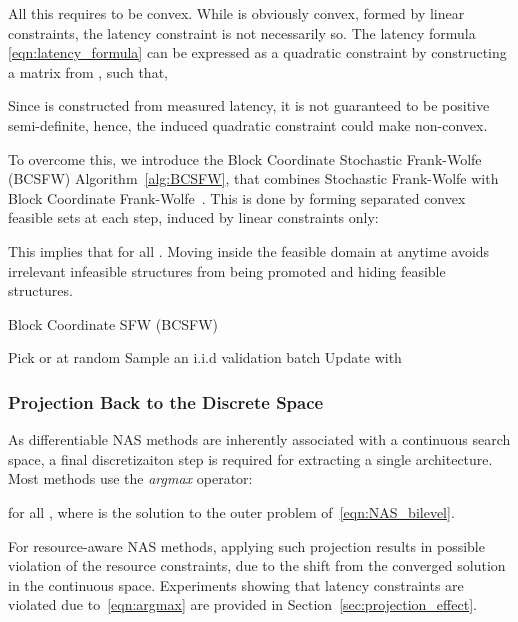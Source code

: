 \documentclass[dvipsnames,table,xcdraw]{article}
\begin{document}
All this requires  to be convex. 
While  is obviously convex, formed by linear constraints, the latency constraint  is not necessarily so. The latency formula \eqref{eqn:latency_formula} can be expressed as a quadratic constraint by constructing a matrix  from , such that,

Since  is constructed from measured latency, it is not guaranteed to be positive semi-definite, hence, the induced quadratic constraint could make  non-convex.

To overcome this, we introduce the Block Coordinate Stochastic Frank-Wolfe (BCSFW) Algorithm~\ref{alg:BCSFW}, that combines Stochastic Frank-Wolfe with Block Coordinate Frank-Wolfe~\cite{BCFW}. This is done by forming separated convex feasible sets at each step, induced by linear constraints only:

 This implies that  for all .
Moving inside the feasible domain at anytime avoids irrelevant infeasible structures from being promoted and hiding feasible structures.
\vspace{1em}
\begin{algorithm}[htb]
   \caption{Block Coordinate SFW (BCSFW)}
   \label{alg:BCSFW}
\begin{algorithmic}
\INPUT 
\FOR{}
\STATE Pick  or  at random
\STATE Sample an i.i.d validation batch 
\STATE 
\STATE Update  with 
\ENDFOR
\end{algorithmic}
\end{algorithm}
 








\subsubsection{Projection Back to the Discrete Space}\label{sec:projection}
As differentiable NAS methods are inherently associated with a continuous search space, a final discretizaiton step  is required for extracting a single architecture. 
Most methods use the \textit{argmax} operator:

for all , where  is the solution to the outer problem of~\eqref{eqn:NAS_bilevel}.


For resource-aware NAS methods, applying such projection results in possible violation of the resource constraints, due to the shift from the converged solution in the continuous space. Experiments showing that latency constraints are violated due to~\eqref{eqn:argmax} are provided in Section~\ref{sec:projection_effect}.
\end{document}
